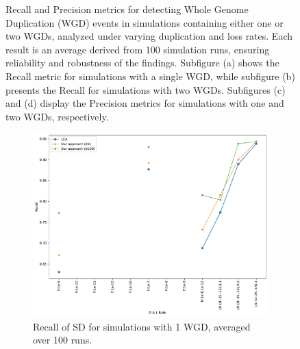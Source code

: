 \documentclass[10pt]{article}
\begin{document}
\begin{figure}[h!]
    \caption{
Recall and Precision metrics for detecting Whole Genome Duplication (WGD) events in simulations containing either one or two WGDs, analyzed under varying duplication and loss rates. Each result is an average derived from 100 simulation runs, ensuring reliability and robustness of the findings. Subfigure (a) shows the Recall metric for simulations with a single WGD, while subfigure (b) presents the Recall for simulations with two WGDs. Subfigures (c) and (d) display the Precision metrics for simulations with one and two WGDs, respectively.
    }
    \label{fig:recall-precision-wgd}
\end{figure}





\begin{figure}[h!]
    \centering
    \begin{subfigure}[b]{0.48\textwidth}
        \centering
        \includegraphics[width=\textwidth]{figs/recall-sd-t20-t80-Avg.pdf}
        \caption{Recall of SD for simulations with 1 WGD, averaged over 100 runs.}
        \label{fig:recall-sd-1wgd}
    \end{subfigure}
    \hfill
    \begin{subfigure}[b]{0.48\textwidth}
        \centering

\end{subfigure}
\end{figure}
\end{document}
